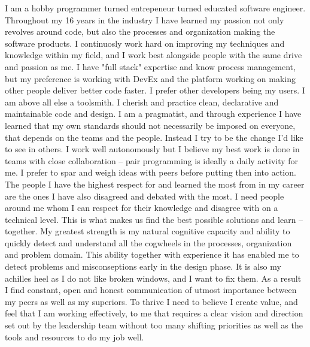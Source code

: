 
I am a hobby programmer turned entrepeneur turned educated software engineer. Throughout my 16 years in the industry I have learned my passion not only revolves around code, but also the processes and organization making the software products.
\newline\newline
I continuosly work hard on improving my techniques and knowledge within my field, and I work best alongside people with the same drive and passion as me.
\newline\newline
I have "full stack" expertise and know process management, but my preference is working with DevEx and the platform working on making other people deliver better code faster. I prefer other developers being my users.
I am above all else a toolsmith.
\newline\newline
I cherish and practice clean, declarative and maintainable code and design. I am a pragmatist, and through experience I have learned that my own standards should not necessarily be imposed on everyone, that depends on the teams and the people. Instead I try to be the change I'd like to see in others.
\newline\newline
I work well autonomously but I believe my best work is done in teams with close collaboration -- pair programming is ideally a daily activity for me. I prefer to spar and weigh ideas with peers before putting then into action. The people I have the highest respect for and learned the most from in my career are the ones I have also disagreed and debated with the most.
I need people around me whom I can respect for their knowledge and disagree with on a technical level. This is what makes us find the best possible solutions and learn -- together.
\newline\newline
My greatest strength is my natural cognitive capacity and ability to quickly detect and understand all the cogwheels in the processes, organization and problem domain. This ability together with experience it has enabled me to detect problems and misconseptions early in the design phase. It is also my achilles heel as I do not like broken windows, and I want to fix them.
\newline\newline
As a result I find constant, open and honest communication of utmost importance between my peers as well as my superiors. 
\newline\newline
To thrive I need to believe I create value, and feel that I am working effectively, to me that requires a clear vision and direction set out by the leadership team without too many shifting priorities as well as the tools and resources to do my job well.